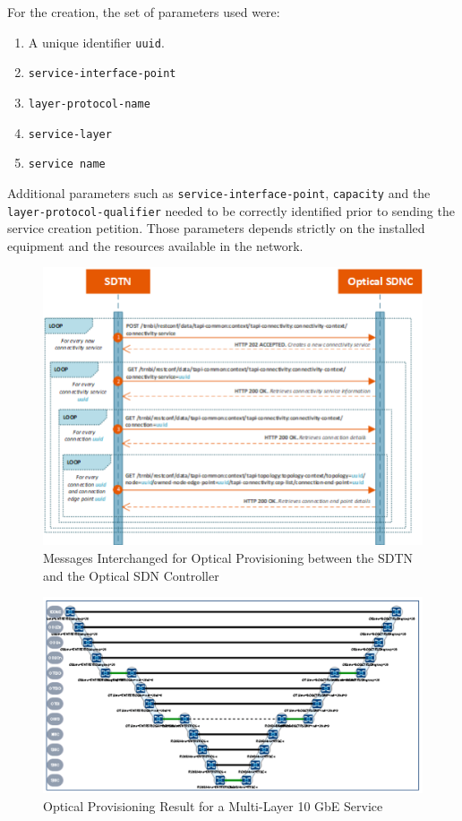 \documentclass[a4paper,fleqn]{cas-dc}
\begin{document}
For the creation, the set of parameters used were: 
\begin{enumerate}
    \item A unique identifier \texttt{uuid}.
    \item \texttt{service-interface-point}
    \item \texttt{layer-protocol-name}
    \item \texttt{service-layer}
    \item \texttt{service name}
\end{enumerate}

Additional parameters such as \texttt{service-interface-point}, \texttt{capacity} and the \texttt{layer-protocol-qualifier} needed to be correctly identified prior to sending the service creation petition. Those parameters depends strictly on the installed equipment and the resources available in the network.

\begin{figure}
	\centering
		\includegraphics[width=\linewidth]{figs/optical_provisioning_workflow_2.png}
	\caption{Messages Interchanged for Optical Provisioning between the SDTN and the Optical SDN Controller}
	\label{FIG:optical_provisioning_workflow}
\end{figure}

\begin{figure}
	\centering
		\includegraphics[width=\linewidth]{figs/optical_provisioning_result.png}
	\caption{Optical Provisioning Result for a Multi-Layer 10 GbE Service}
	\label{FIG:optical_provisioning_result}
\end{figure}
\end{document}
